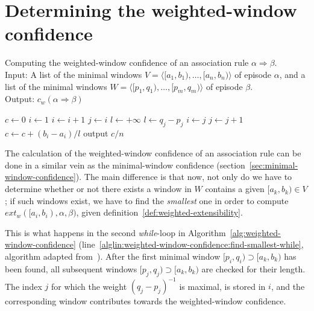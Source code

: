 \section{Determining the weighted-window confidence}
\label{sec:weighted-window-confidence}

\begin{algorithm}

\caption{Computing the weighted-window confidence of an association rule $ \alpha \Rightarrow \beta $.\\
Input: A list of the minimal windows $ V = \langle [a_1, b_1), \ldots, [a_n, b_n) \rangle $ of episode $ \alpha $, and a list of the minimal windows $ W = \langle [p_1, q_1), \ldots, [p_m, q_m) \rangle $ of episode $ \beta $.\\
Output: $ c_w(\alpha \Rightarrow \beta) $
}

\begin{algorithmic}[1]

\State $ c \gets 0 $
\State $ i \gets 1 $
        \State $ i \gets i + 1 $
    \EndWhile
    \State $ j \gets i $
    \State $ l \gets +\infty $
     \label{alglin:weighted-window-confidence:find-smallest-while}
            \State $ l \gets q_j - p_j $
            \State $ i \gets j $
        \EndIf
        \State $ j \gets j + 1 $
    \EndWhile
        \State $ c \gets c + (b_i - a_i) / l $
    \EndIf
\EndFor
\State output $ c / n $

\end{algorithmic}

\label{alg:weighted-window-confidence}
\end{algorithm}

The calculation of the weighted-window confidence of an association rule can be done in a similar vein as the minimal-window confidence (section~\ref{sec:minimal-window-confidence}). The main difference is that now, not only do we have to determine whether or not there exists a window in $ W $ contains a given $ [a_k, b_k) \in V $; if such windows exist, we have to find the \emph{smallest} one in order to compute $ ext_w([a_i, b_i), \alpha, \beta) $, given definition~\ref{def:weighted-extensibility}.

This is what happens in the second \emph{while}-loop in Algorithm~\ref{alg:weighted-window-confidence} (line~\ref{alglin:weighted-window-confidence:find-smallest-while}, algorithm adapted from~\cite{cule2014marbles}). After the first minimal window $ [p_i, q_i) \supset [a_k, b_k) $ has been found, all subsequent windows $ [p_j, q_j) \supset [a_k, b_k) $ are checked for their length. The index $ j $ for which the weight $ (q_j - p_j)^{-1} $ is maximal, is stored in $ i $, and the corresponding window contributes towards the weighted-window confidence.

